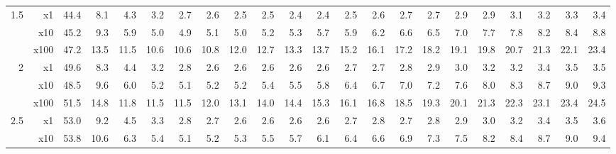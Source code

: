 \documentclass[12pt,preprint]{aastex}
\begin{document}
\begin{table}
\begin{centering}
\begin{tabular}{r|r|rrrrrrrrrrrrrrrrrrrr}
        \hline
             1.5 &       x1 &       44.4 &        8.1 &        4.3 &        3.2 &        2.7 &        2.6 &        2.5 &        2.5 &        2.4 &        2.4 &        2.5 &        2.6 &        2.7 &        2.7 &        2.9 &        2.9 &        3.1 &        3.2 &        3.3 &        3.4 \\
                 &      x10 &       45.2 &        9.3 &        5.9 &        5.0 &        4.9 &        5.1 &        5.0 &        5.2 &        5.3 &        5.7 &        5.9 &        6.2 &        6.6 &        6.5 &        7.0 &        7.7 &        7.8 &        8.2 &        8.4 &        8.8 \\
                 &     x100 &       47.2 &       13.5 &       11.5 &       10.6 &       10.6 &       10.8 &       12.0 &       12.7 &       13.3 &       13.7 &       15.2 &       16.1 &       17.2 &       18.2 &       19.1 &       19.8 &       20.7 &       21.3 &       22.1 &       23.4 \\
               2 &       x1 &       49.6 &        8.3 &        4.4 &        3.2 &        2.8 &        2.6 &        2.6 &        2.6 &        2.6 &        2.6 &        2.7 &        2.7 &        2.8 &        2.9 &        3.0 &        3.2 &        3.2 &        3.4 &        3.5 &        3.5 \\
                 &      x10 &       48.5 &        9.6 &        6.0 &        5.2 &        5.1 &        5.2 &        5.2 &        5.4 &        5.5 &        5.8 &        6.4 &        6.7 &        7.0 &        7.2 &        7.6 &        8.0 &        8.3 &        8.7 &        9.0 &        9.3 \\
                 &     x100 &       51.5 &       14.8 &       11.8 &       11.5 &       11.5 &       12.0 &       13.1 &       14.0 &       14.4 &       15.3 &       16.1 &       16.8 &       18.5 &       19.3 &       20.1 &       21.3 &       22.3 &       23.1 &       23.4 &       24.5 \\
             2.5 &       x1 &       53.0 &        9.2 &        4.5 &        3.3 &        2.8 &        2.7 &        2.6 &        2.6 &        2.6 &        2.6 &        2.7 &        2.8 &        2.7 &        2.8 &        2.9 &        3.0 &        3.2 &        3.4 &        3.5 &        3.6 \\
                 &      x10 &       53.8 &       10.6 &        6.3 &        5.4 &        5.1 &        5.2 &        5.3 &        5.5 &        5.7 &        6.1 &        6.4 &        6.6 &        6.9 &        7.3 &        7.5 &        8.2 &        8.4 &        8.7 &        9.0 &        9.4 \\

\end{tabular}
\end{centering}
\end{table}
\end{document}
